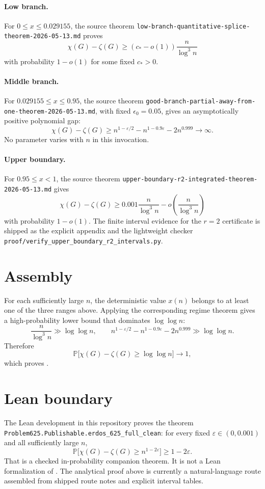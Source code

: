 \documentclass[11pt,a4paper]{article}
\newcommand{\chrom}{\chi}
\newcommand{\cochrom}{\zeta}
\renewcommand{\Pr}{\mathbb{P}}
\begin{document}
\paragraph{Low branch.}
For $0\le x\le 0.029155$, the source theorem
\texttt{low-branch-quantitative-splice-theorem-2026-05-13.md} proves
\[
  \chrom(G)-\cochrom(G)\ge (c_*-o(1))\frac{n}{\log^3 n}
\]
with probability $1-o(1)$ for some fixed $c_*>0$.

\paragraph{Middle branch.}
For $0.029155\le x\le 0.95$, the source theorem
\texttt{good-branch-partial-away-from-one-theorem-2026-05-13.md}, with
fixed $\epsilon_0=0.05$, gives an asymptotically positive polynomial gap:
\[
  \chrom(G)-\cochrom(G)
  \ge n^{1-\varepsilon/2}-n^{1-0.9\varepsilon}-2n^{0.999}
  \to\infty.
\]
No parameter varies with $n$ in this invocation.

\paragraph{Upper boundary.}
For $0.95\le x<1$, the source theorem
\texttt{upper-boundary-r2-integrated-theorem-2026-05-13.md} gives
\[
  \chrom(G)-\cochrom(G)
  \ge 0.001\frac{n}{\log^3 n}-o\!\left(\frac{n}{\log^3 n}\right)
\]
with probability $1-o(1)$.  The finite interval evidence for the
$r=2$ certificate is shipped as the explicit appendix and the lightweight
checker \texttt{proof/verify\_upper\_boundary\_r2\_intervals.py}.

\section{Assembly}

For each sufficiently large $n$, the deterministic value $x(n)$ belongs
to at least one of the three ranges above.  Applying the corresponding
regime theorem gives a high-probability lower bound that dominates
$\log\log n$:
\[
  \frac{n}{\log^3 n}\gg\log\log n,
  \qquad
  n^{1-\varepsilon/2}-n^{1-0.9\varepsilon}-2n^{0.999}\gg\log\log n.
\]
Therefore
\[
  \Pr\bigl[\chrom(G)-\cochrom(G)\ge\log\log n\bigr]\to 1,
\]
which proves .

\section{Lean boundary}

The Lean development in this repository proves the theorem
\texttt{Problem625.Publishable.erdos\_625\_full\_clean}: for every fixed
$\varepsilon\in(0,0.001)$ and all sufficiently large $n$,
\[
  \Pr\bigl[\chrom(G)-\cochrom(G)\ge n^{1-2\varepsilon}\bigr]
  \ge 1-2\varepsilon.
\]
That is a checked in-probability companion theorem.  It is not a Lean
formalization of .  The analytical proof above is
currently a natural-language route assembled from shipped route notes and
explicit interval tables.
\end{document}
